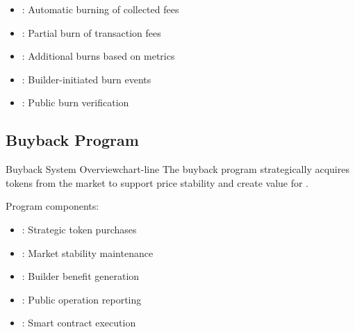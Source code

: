 \begin{itemize}[leftmargin=*]
\item {}: Automatic burning of collected fees
\item {}: Partial burn of transaction fees
\item {}: Additional burns based on metrics
\item {}: Builder-initiated burn events
\item {}: Public burn verification
\end{itemize}

\subsection{Buyback Program}

\begin{mfai-box-prove}{Buyback System Overview}{chart-line}
The buyback program strategically acquires tokens from the market to support price stability and create value for .
\end{mfai-box-prove}

Program components:

\begin{itemize}[leftmargin=*]
\item {}: Strategic token purchases
\item {}: Market stability maintenance
\item {}: Builder benefit generation
\item {}: Public operation reporting
\item {}: Smart contract execution
\end{itemize}

\begin{center}
\end{center}

